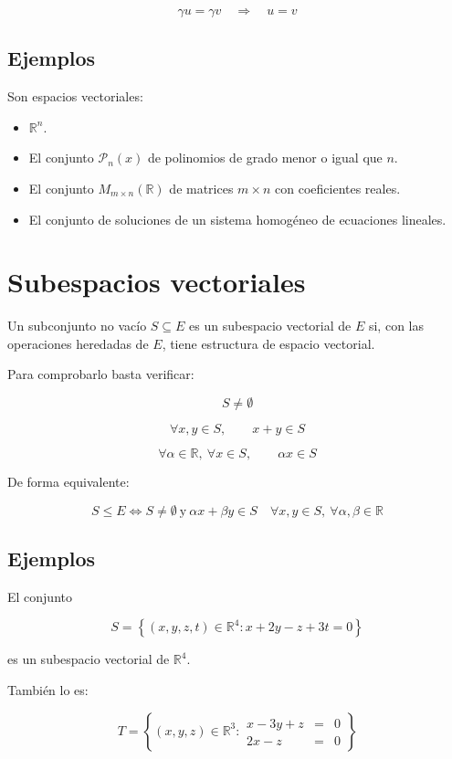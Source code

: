 \documentclass[11pt,a4paper]{article}
\newcommand{\R}{\mathbb{R}}
\newcommand{\Pn}{\mathcal{P}}
\begin{document}
\[
\gamma u=\gamma v
\quad\Longrightarrow\quad
u=v
\]

\subsection{Ejemplos}

Son espacios vectoriales:

\begin{itemize}
	\item $\R^n$.
	\item El conjunto $\Pn_n(x)$ de polinomios de grado menor o igual que $n$.
	\item El conjunto $M_{m\times n}(\R)$ de matrices $m\times n$ con coeficientes reales.
	\item El conjunto de soluciones de un sistema homogéneo de ecuaciones lineales.
\end{itemize}

\section{Subespacios vectoriales}

Un subconjunto no vacío $S\subseteq E$ es un subespacio vectorial de $E$ si, con las operaciones heredadas de $E$, tiene estructura de espacio vectorial.

Para comprobarlo basta verificar:

\[
S\neq\emptyset
\]

\[
\forall x,y\in S,
\qquad
x+y\in S
\]

\[
\forall\alpha\in\R,\ \forall x\in S,
\qquad
\alpha x\in S
\]

De forma equivalente:

\[
\boxed{
S\leq E
\iff
S\neq\emptyset
\ \text{y}\
\alpha x+\beta y\in S
\quad
\forall x,y\in S,\ \forall\alpha,\beta\in\R
}
\]

\subsection{Ejemplos}

El conjunto

\[
S=
\left\{
(x,y,z,t)\in\R^4:
x+2y-z+3t=0
\right\}
\]

es un subespacio vectorial de $\R^4$.

También lo es:

\[
T=
\left\{
(x,y,z)\in\R^3:
\begin{array}{rcl}
x-3y+z&=&0\\
2x-z&=&0
\end{array}
\right\}
\]
\end{document}
